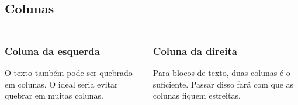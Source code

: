 \documentclass[aspectratio=169]{beamer}
\begin{document}
\subsection{Colunas}
\begin{frame}[t]\frametitle{\secname}\framesubtitle{\subsecname}
  \begin{columns}[T]
    \begin{column}{.5\textwidth}
      \subsubsection{Coluna da esquerda}

      O texto também pode ser quebrado em colunas.
      O ideal seria evitar quebrar em muitas colunas.
    \end{column}
    \begin{column}{.5\textwidth}
      \subsubsection{Coluna da direita}

      Para blocos de texto, duas colunas é o suficiente.
      Passar disso fará com que as colunas fiquem estreitas.
    \end{column}
  \end{columns}

\end{frame}
\end{document}
